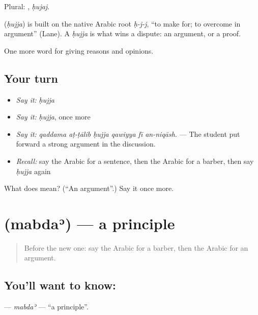 Plural: , \emph{ḥujaj}.

\begin{cousinweb}
\textbf{} (\emph{ḥujja}) is built on the native Arabic root \emph{ḥ-j-j}, \textquotedblleft{}to make for; to overcome in argument\textquotedblright{} (Lane). A \emph{ḥujja} is what wins a dispute: an argument, or a proof.
\end{cousinweb}

\begin{grammarlens}[title={What you've built}]
One more word for giving reasons and opinions.
\end{grammarlens}

\subsection*{Your turn}
\begin{itemize}
\raggedright
  \item \emph{Say it:} \emph{ḥujja}
  \item \emph{Say it:} \emph{ḥujja}, once more
  \item \emph{Say it:} \emph{qaddama aṭ-ṭālib ḥujja qawiyya fī an-niqāsh.} — The student put forward a strong argument in the discussion.
  \item \emph{Recall:} say the Arabic for a sentence, then the Arabic for a barber, then say \emph{ḥujja} again
\end{itemize}

\begin{tcolorbox}[breakable,colback=teal!4,colframe=teal!35!black,title={Before you move on}]
What does  mean? (\textquotedblleft{}An argument\textquotedblright{}.) Say it once more.
\end{tcolorbox}
\section[\texorpdfstring{\ar{مبدأ} (mabdaʾ)}{مبدأ (mabdaʾ)}]{ (mabdaʾ) — a principle}

\label{lesson:AR-C358-mabda}



\begin{quote}
Before the new one: say the Arabic for a barber, then the Arabic for an argument.
\end{quote}

\subsection*{You'll want to know: }
\textbf{} — \emph{mabdaʾ} — \textquotedblleft{}a principle\textquotedblright{}.

